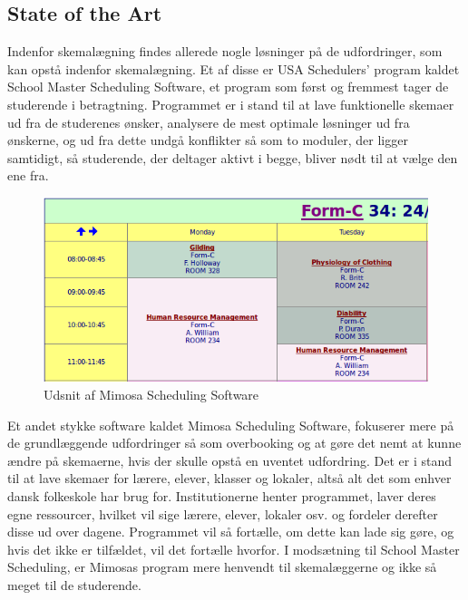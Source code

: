\subsection{State of the Art}
\label{sota}
Indenfor skemalægning findes allerede nogle løsninger på de udfordringer, som kan opstå indenfor skemalægning. Et af disse er USA Schedulers' program kaldet School Master Scheduling Software\cite{USAS}, et program som først og fremmest tager de studerende i betragtning. Programmet er i stand til at lave funktionelle skemaer ud fra de studerenes ønsker, analysere de mest optimale løsninger ud fra ønskerne, og ud fra dette undgå konflikter så som to moduler, der ligger samtidigt, så studerende, der deltager aktivt i begge, bliver nødt til at vælge den ene fra.

\begin{figure}[h!]
	\centering
	\includegraphics[width=1.0\textwidth]{../Billeder/MimosaSoftware.png}
	\caption{Udsnit af Mimosa Scheduling Software\cite{mimosaPicture}}
	\label{fig:Mimosa}
\end{figure}
\FloatBarrier
Et andet stykke software kaldet Mimosa Scheduling Software\cite{Mimosa}, fokuserer mere på de grundlæggende udfordringer så som overbooking og at gøre det nemt at kunne ændre på skemaerne, hvis der skulle opstå en uventet udfordring. Det er i stand til at lave skemaer for lærere, elever, klasser og lokaler, altså alt det som enhver dansk folkeskole har brug for. Institutionerne henter programmet, laver deres egne ressourcer, hvilket vil sige lærere, elever, lokaler osv. og fordeler derefter disse ud over dagene. Programmet vil så fortælle, om dette kan lade sig gøre, og hvis det ikke er tilfældet, vil det fortælle hvorfor\cite{MimosaTutorial}. I modsætning til School Master Scheduling, er Mimosas program mere henvendt til skemalæggerne og ikke så meget til de studerende. 

